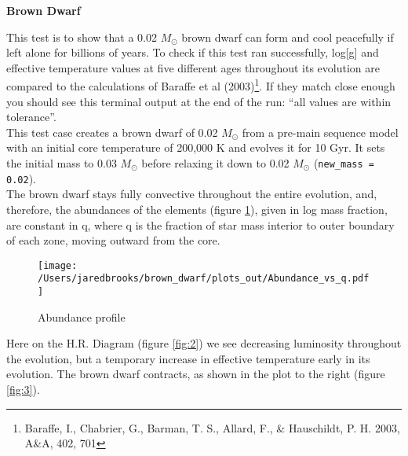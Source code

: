 \documentclass{article}
\begin{document}
	\begin{center}
		\begin{Large}
			\textbf{Brown Dwarf}\\
		\end{Large}
	\end{center}
	
        This test is to show that a 0.02 $M_\odot$ brown dwarf can form and cool peacefully if left alone for billions of years.  To check if this test ran successfully, log[g] and effective temperature values at five different ages throughout its evolution are compared to the calculations of Baraffe et al (2003)\footnote{Baraffe, I., Chabrier, G., Barman, T. S., Allard, F., \& Hauschildt, P. H. 2003, A\&A, 402, 701}.  If they match close enough you should see this terminal output at the end of the run: ``all values are within tolerance''.\\

        This test case creates a brown dwarf of 0.02 $M_\odot$ from a pre-main sequence model with an initial core temperature of 200,000 K and evolves it for 10 Gyr.  It sets the initial mass to 0.03 $M_\odot$ before relaxing it down to 0.02 $M_\odot$ (\texttt{new\_mass = 0.02}).\\

        The brown dwarf stays fully convective throughout the entire evolution, and, therefore, the abundances of the elements (figure \ref{fig:1}), given in log mass fraction, are constant in q, where q is the fraction of star mass interior to outer boundary of each zone, moving outward from the core.

	\begin{figure}[H]
		\centering
		\texttt{[image: /Users/jaredbrooks/brown\_dwarf/plots\_out/Abundance\_vs\_q.pdf]}
		\caption{Abundance profile}
		\label{fig:1}
	\end{figure}

        \pagebreak

        Here on the H.R. Diagram (figure \ref{fig:2}) we see decreasing luminosity throughout the evolution, but a temporary increase in effective temperature early in its evolution.  The brown dwarf contracts, as shown in the plot to the right (figure \ref{fig:3}).
\end{document}
